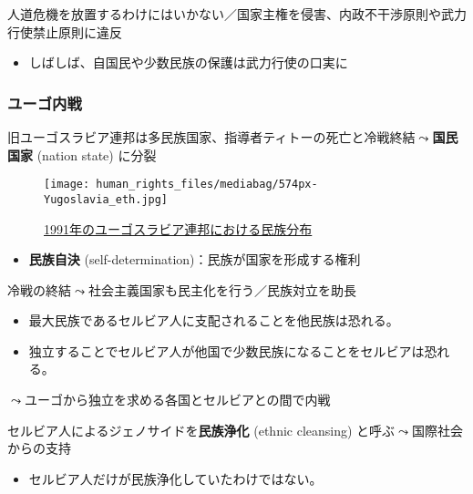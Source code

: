 \documentclass[
  xelatex,
  ja=standard]{bxjsarticle}
\providecommand{\tightlist}{%
  \setlength{\itemsep}{0pt}\setlength{\parskip}{0pt}}\usepackage{longtable,booktabs,array}
\begin{document}
人道危機を放置するわけにはいかない／国家主権を侵害、内政不干渉原則や武力行使禁止原則に違反

\begin{itemize}
\tightlist
\item
  しばしば、自国民や少数民族の保護は武力行使の口実に
\end{itemize}

\hypertarget{ux30e6ux30fcux30b4ux5185ux6226}{%
\subsubsection{ユーゴ内戦}\label{ux30e6ux30fcux30b4ux5185ux6226}}

旧ユーゴスラビア連邦は多民族国家、指導者ティトーの死亡と冷戦終結\(\leadsto\)\textbf{国民国家}
(nation state) に分裂

\begin{figure}[htpb]

{\centering \texttt{[image: human\_rights\_files/mediabag/574px-Yugoslavia\_eth.jpg]}

}

\caption{\href{https://commons.wikimedia.org/wiki/File:Yugoslavia_ethnic_map.jpg}{1991年のユーゴスラビア連邦における民族分布}}

\end{figure}

\begin{itemize}
\tightlist
\item
  \textbf{民族自決} (self-determination)：民族が国家を形成する権利
\end{itemize}

冷戦の終結\(\leadsto\)社会主義国家も民主化を行う／民族対立を助長

\begin{itemize}
\tightlist
\item
  最大民族であるセルビア人に支配されることを他民族は恐れる。
\item
  独立することでセルビア人が他国で少数民族になることをセルビアは恐れる。
\end{itemize}

\(\leadsto\)ユーゴから独立を求める各国とセルビアとの間で内戦

セルビア人によるジェノサイドを\textbf{民族浄化} (ethnic cleansing)
と呼ぶ\(\leadsto\)国際社会からの支持

\begin{itemize}
\tightlist
\item
  セルビア人だけが民族浄化していたわけではない。
\end{itemize}
\end{document}
